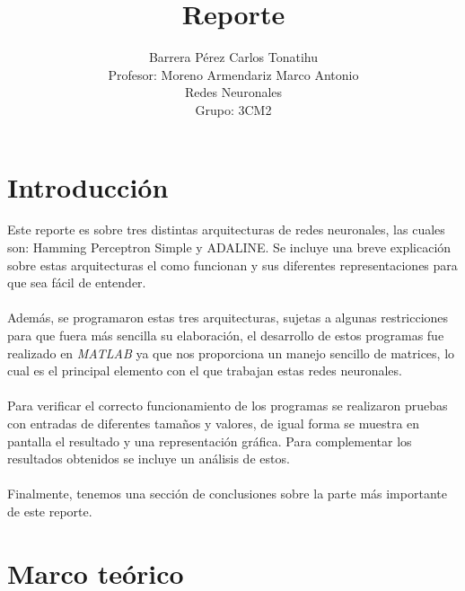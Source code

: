 \documentclass[12pt, titlepage]{article}
\title{Reporte}
\author{Barrera Pérez Carlos Tonatihu \\ Profesor: Moreno Armendariz Marco Antonio \\ Redes Neuronales \\ Grupo: 3CM2 }
\begin{document}
    \maketitle
    \tableofcontents
    \newpage
    \section{Introducción}
        Este reporte es sobre tres distintas arquitecturas de redes neuronales, las cuales son: Hamming Perceptron Simple y ADALINE. Se incluye una breve explicación sobre estas arquitecturas el como funcionan y sus diferentes representaciones para que sea fácil de entender.
        \\\\
        Además, se programaron estas tres arquitecturas, sujetas a algunas restricciones para que fuera más sencilla su elaboración, el desarrollo de estos programas fue realizado en \emph{MATLAB} ya que nos proporciona un manejo sencillo de matrices, lo cual es el principal elemento con el que trabajan estas redes neuronales. 
        \\\\
        Para verificar el correcto funcionamiento de los programas se realizaron pruebas con entradas de diferentes tamaños y valores, de igual forma se muestra en pantalla el resultado y una representación gráfica. Para complementar los resultados obtenidos se incluye un análisis de estos.
        \\\\
        Finalmente, tenemos una sección de conclusiones sobre la parte más importante de este reporte.
    \newpage
    \section{Marco teórico}
\end{document}
